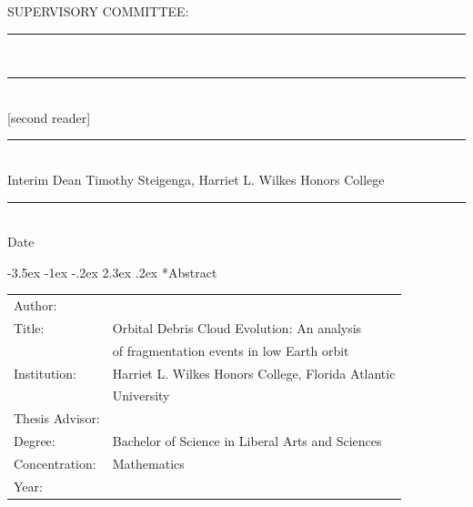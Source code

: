 \documentclass[a4paper, 12pt]{article}
\makeatletter
\renewcommand{\arraystretch}{0.5} %
\renewcommand\section{\clearpage\newpage\@startsection {section}{1}{\z@}%
	{-3.5ex \@plus -1ex \@minus -.2ex}%
	{2.3ex \@plus.2ex}%
	{\normalfont\Large\bfseries}}
\makeatother
\begin{document}
\vspace{1in}
SUPERVISORY COMMITTEE:

\newcommand{\myrule}{\vspace{0.5in}\rule{4in}{0.5pt} \\}

\myrule
\myadvisor

\myrule 
{}[second reader]

\myrule
Interim Dean Timothy Steigenga, Harriet L. Wilkes Honors College 

\myrule
Date

\newpage



\myskip

\newpage


\section*{Abstract}

\myskip
\renewcommand{\arraystretch}{1.5}
\begin{tabular}{@{}l@{\hspace{3ex}}l}
	Author: & \myauthor \\
	Title: & Orbital Debris Cloud Evolution: An analysis \\
	 & of fragmentation events in low Earth orbit \\
	Institution: & Harriet L. Wilkes Honors College, Florida Atlantic  \\
	& University \\
	Thesis Advisor: & \myadvisor \\
	Degree: & Bachelor of Science in Liberal Arts and Sciences \\
	Concentration: & Mathematics \\
	Year: & \the\year
\end{tabular}
\end{document}

